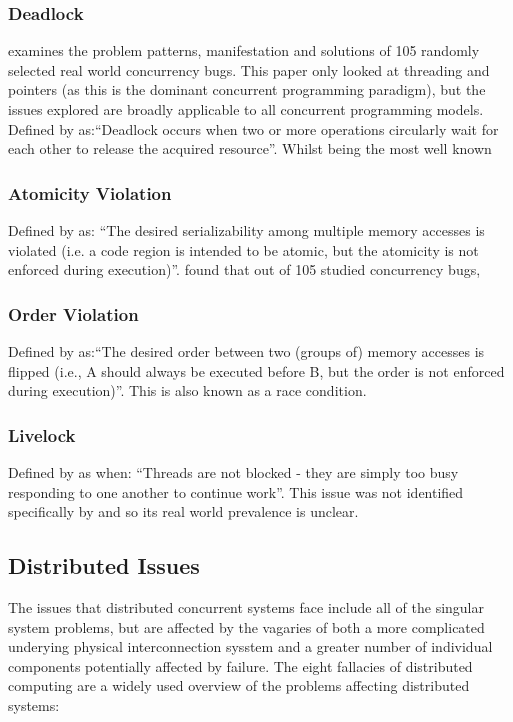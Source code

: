\documentclass{sig-alternate}
\begin{document}
\subsubsection{Deadlock}
\cite{shanlu08:_learn_mistak_compr_study_real} examines the problem patterns, manifestation and solutions of 105 randomly selected real world concurrency bugs. This paper only looked at threading and pointers (as this is the dominant concurrent programming paradigm), but the issues explored are broadly applicable to all concurrent programming models.
Defined by \cite{shanlu08:_learn_mistak_compr_study_real} as:``Deadlock occurs when two or more operations circularly wait for each other to release the acquired resource''. Whilst being the most well known 

\subsubsection{Atomicity Violation}
Defined by \cite{shanlu08:_learn_mistak_compr_study_real} as: ``The desired serializability among multiple memory accesses is violated (i.e. a code region is intended to be atomic, but the atomicity is not enforced during execution)''. \cite{shanlu08:_learn_mistak_compr_study_real} found that out of 105 studied concurrency bugs, 

\subsubsection{Order Violation}
Defined by \cite{shanlu08:_learn_mistak_compr_study_real} as:``The desired order between two (groups of) memory accesses is flipped (i.e., A should always be executed before B, but the order is not enforced during execution)''. This is also known as a race condition. 

\subsubsection{Livelock}
Defined by \cite{oracle:_starv_livel} as when: ``Threads are not blocked - they are simply too busy responding to one another to continue work''. This issue was not identified specifically by \cite{shanlu08:_learn_mistak_compr_study_real} and so its real world prevalence is unclear.

\subsection{Distributed Issues}
The issues that distributed concurrent systems face include all of the singular system problems, but are affected by the vagaries of both a more complicated underying physical interconnection sysstem and a greater number of individual components potentially affected by failure. The eight fallacies of distributed computing are a widely used overview of the problems affecting distributed systems:
\end{document}
